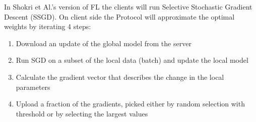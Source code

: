 \documentclass[
	ngerman,
	ruledheaders=section,%
	class=report,%
	thesis={type=bachelor},%
	accentcolor=1b,%
	custommargins=true,%
	marginpar=false,%
	parskip=half-,%
	fontsize=11pt,%
]{tudapub}
\begin{document}
In Shokri et Al.'s version of FL the clients will run Selective Stochastic Gradient Descent (SSGD). On client side the Protocol will approximate the optimal weights by iterating 4 steps:

\begin{enumerate}
    \item Download an update of the global model from the server
    \item Run SGD on a subset of the local data (batch) and update the local model
    \item Calculate the gradient vector that describes the change in the local parameters
    \item Upload a fraction of the gradients, picked either by random selection with threshold or by selecting the largest values
\end{enumerate}
\end{document}
